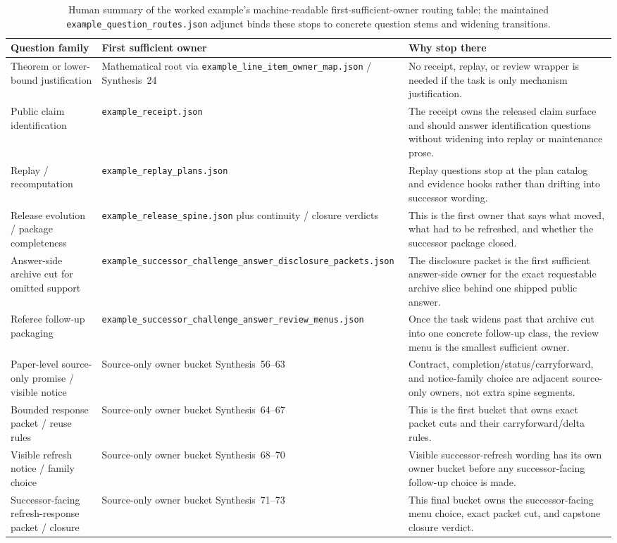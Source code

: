 \documentclass[11pt]{article}
\begin{document}
\begin{table}[t]
\centering
\small
\begin{tabularx}{\linewidth}{@{}l l X@{}}
\toprule
Question family & First sufficient owner & Why stop there \\
\midrule
Theorem or lower-bound justification & Mathematical root via \texttt{example\_line\_item\_owner\_map.json} / Synthesis~24 & No receipt, replay, or review wrapper is needed if the task is only mechanism justification. \\
Public claim identification & \texttt{example\_receipt.json} & The receipt owns the released claim surface and should answer identification questions without widening into replay or maintenance prose. \\
Replay / recomputation & \texttt{example\_replay\_plans.json} & Replay questions stop at the plan catalog and evidence hooks rather than drifting into successor wording. \\
Release evolution / package completeness & \texttt{example\_release\_spine.json} plus continuity / closure verdicts & This is the first owner that says what moved, what had to be refreshed, and whether the successor package closed. \\
Answer-side archive cut for omitted support & \texttt{example\_successor\_challenge\_answer\_disclosure\_packets.json} & The disclosure packet is the first sufficient answer-side owner for the exact requestable archive slice behind one shipped public answer. \\
Referee follow-up packaging & \texttt{example\_successor\_challenge\_answer\_review\_menus.json} & Once the task widens past that archive cut into one concrete follow-up class, the review menu is the smallest sufficient owner. \\
Paper-level source-only promise / visible notice & Source-only owner bucket Synthesis~56--63 & Contract, completion/status/carryforward, and notice-family choice are adjacent source-only owners, not extra spine segments. \\
Bounded response packet / reuse rules & Source-only owner bucket Synthesis~64--67 & This is the first bucket that owns exact packet cuts and their carryforward/delta rules. \\
Visible refresh notice / family choice & Source-only owner bucket Synthesis~68--70 & Visible successor-refresh wording has its own owner bucket before any successor-facing follow-up choice is made. \\
Successor-facing refresh-response packet / closure & Source-only owner bucket Synthesis~71--73 & This final bucket owns the successor-facing menu choice, exact packet cut, and capstone closure verdict. \\
\bottomrule
\end{tabularx}
\caption{Human summary of the worked example's machine-readable first-sufficient-owner routing table; the maintained \texttt{example\_question\_routes.json} adjunct binds these stops to concrete question stems and widening transitions.}
\label{tab:workedexample-routingcuts}
\end{table}
\end{document}

